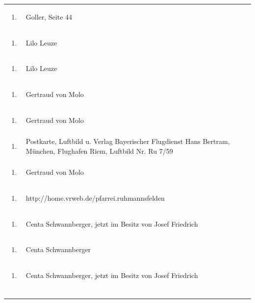 \documentclass[a4paper]{article}
\begin{document}
\begin{flushleft}
\begin{supertabular}{m{1.2409999cm}m{14.604cm}}
\begin{enumerate}
\item
\end{enumerate}
 &
Goller, Seite 44\\
\begin{enumerate}
\item
\end{enumerate}
 &
Lilo Leuze\\
\begin{enumerate}
\item
\end{enumerate}
 &
Lilo Leuze\\
\begin{enumerate}
\item
\end{enumerate}
 &
Gertraud von Molo\\
\begin{enumerate}
\item
\end{enumerate}
 &
Gertraud von Molo\\
\begin{enumerate}
\item
\end{enumerate}
 &
Postkarte, Luftbild u. Verlag Bayerischer Flugdienst Hans Bertram,
München, Flughafen Riem, Luftbild Nr. Ru 7/59\\
\begin{enumerate}
\item
\end{enumerate}
 &
Gertraud von Molo\\
\begin{enumerate}
\item
\end{enumerate}
 &
http://home.vrweb.de/pfarrei.ruhmannsfelden\\
\begin{enumerate}
\item
\end{enumerate}
 &
Centa Schwannberger, jetzt im Besitz von Josef Friedrich\\
\begin{enumerate}
\item
\end{enumerate}
 &
Centa Schwannberger\\
\begin{enumerate}
\item
\end{enumerate}
 &
Centa Schwannberger, jetzt im Besitz von Josef Friedrich\\
\begin{enumerate}

\end{enumerate}
\end{supertabular}
\end{flushleft}
\end{document}
